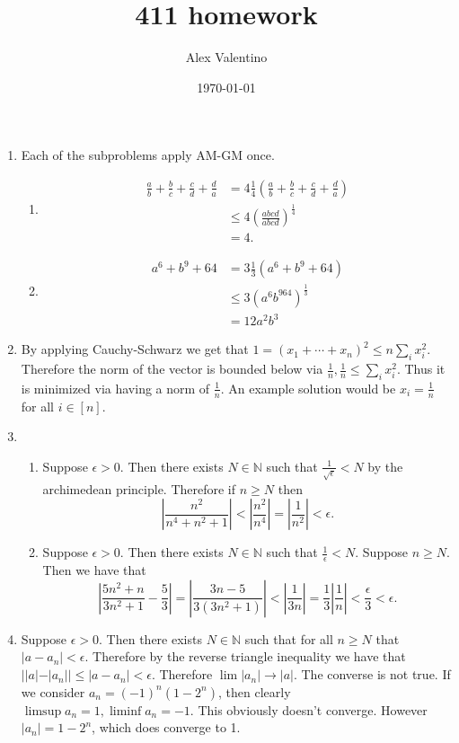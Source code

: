 \documentclass[12pt, letterpaper]{article}
\date{\today}
\author{Alex Valentino}
\title{411 homework}
\newcommand{\N}{\mathbb{N}}
\begin{document}
\begin{enumerate}
	\item Each of the subproblems apply AM-GM once.  
	\begin{enumerate}
		\item 
		\begin{align*}
			\frac{a}{b}+\frac{b}{c}+\frac{c}{d}+\frac{d}{a} &= 4 \frac{1}{4} \left(\frac{a}{b}+\frac{b}{c}+\frac{c}{d}+\frac{d}{a}\right)\\
			&\leq 4 \left(\frac{abcd}{abcd} \right)^{\frac{1}{4}}\\
			&= 4.
		\end{align*}
		\item 
		\begin{align*}
			a^6 + b^9 + 64 &= 3 \frac{1}{3}(a^6 + b^9 + 64)\\
			&\leq 3(a^6b^964)^\frac{1}{3}\\
			&= 12a^2b^3
		\end{align*}
	\end{enumerate}
	\item By applying Cauchy-Schwarz we get that $1 = (x_1 + \cdots + x_n)^2 \leq n\sum_{i} x_i^2$.
	Therefore the norm of the vector is bounded below via $\frac{1}{n}, \frac{1}{n} \leq \sum_{i} x_i^2$.
	Thus it is minimized via having a norm of $\frac{1}{n}$.  An example solution would be $x_i = \frac{1}{n}$ for all $i \in [n]$.  
	\item 
	\begin{enumerate}
		\item Suppose $\epsilon	> 0$.  Then there exists $N \in \N$ such that 
		$\frac{1}{\sqrt{\epsilon}} < N$ by the archimedean principle.  Therefore
		if $n \geq N$ then 
		$$
		\left| \frac{n^2}{n^4 + n^2 + 1} \right| < \left|\frac{n^2}{n^4}\right| = \left|\frac{1}{n^2} \right| < \epsilon.  
		$$  
		\item Suppose $\epsilon	> 0$. Then there exists $N \in \N$ such that 
		$\frac{1}{\epsilon} < N$.  Suppose $n \geq N$.  Then we have that
		$$
		\left| \frac{5n^2 + n}{3n^2 + 1} - \frac{5}{3}\right| = \left| \frac{3n - 5}{3(3n^2 + 1)} \right| < \left| \frac{1}{3n} \right| = \frac{1}{3}\left| \frac{1}{n} \right| < \frac{\epsilon}{3} < \epsilon.
 		$$
	\end{enumerate}
	\item Suppose $\epsilon >0$.   Then there exists $N \in \N$ such that for all $n \geq N$ that $|a - a_n| < \epsilon$.  Therefore by the reverse triangle 
	inequality we have that $||a| - |a_n|| \leq |a-a_n| < \epsilon$.  Therefore 
	$\lim |a_n| \to |a|$.  The converse is not true.  If we consider $a_n = (-1)^n(1-2^n)$, then clearly $\limsup a_n = 1, \liminf a_n = -1$.  This obviously doesn't converge.  However $|a_n| = 1 - 2^n$, which does converge to 1.  

\end{enumerate}
\end{document}
